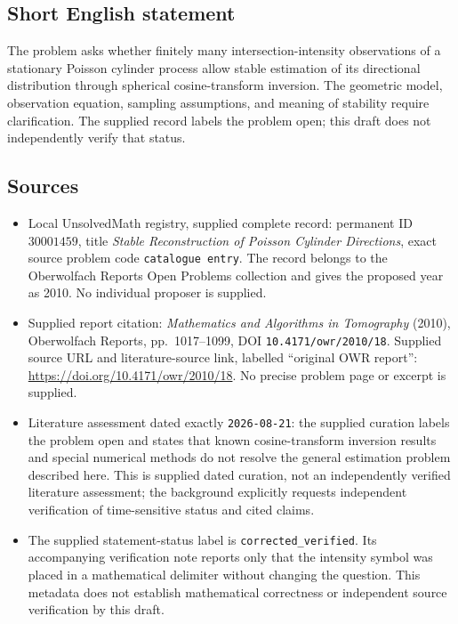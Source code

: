 \documentclass[11pt]{article}
\begin{document}
\subsection{Short English statement}
The problem asks whether finitely many intersection-intensity observations of a stationary Poisson cylinder process allow stable estimation of its directional distribution through spherical cosine-transform inversion. The geometric model, observation equation, sampling assumptions, and meaning of stability require clarification. The supplied record labels the problem open; this draft does not independently verify that status.
\subsection{Sources}
\begin{itemize}
\item Local UnsolvedMath registry, supplied complete record: permanent ID \(30001459\), title \emph{Stable Reconstruction of Poisson Cylinder Directions}, exact source problem code \texttt{catalogue entry}. The record belongs to the Oberwolfach Reports Open Problems collection and gives the proposed year as 2010. No individual proposer is supplied.
\item Supplied report citation: \emph{Mathematics and Algorithms in Tomography} (2010), Oberwolfach Reports, pp.\ 1017--1099, DOI \texttt{10.4171/owr/2010/18}. Supplied source URL and literature-source link, labelled ``original OWR report'': \url{https://doi.org/10.4171/owr/2010/18}. No precise problem page or excerpt is supplied.
\item Literature assessment dated exactly \texttt{2026-08-21}: the supplied curation labels the problem open and states that known cosine-transform inversion results and special numerical methods do not resolve the general estimation problem described here. This is supplied dated curation, not an independently verified literature assessment; the background explicitly requests independent verification of time-sensitive status and cited claims.
\item The supplied statement-status label is \texttt{corrected\_verified}. Its accompanying verification note reports only that the intensity symbol was placed in a mathematical delimiter without changing the question. This metadata does not establish mathematical correctness or independent source verification by this draft.
\end{itemize}
\end{document}
